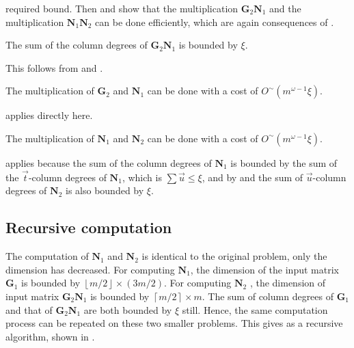 required bound. Then  and 
show that the multiplication $\mathbf{G}_{2}\mathbf{N}_{1}$ and the
multiplication $\mathbf{N}_{1}\mathbf{N}_{2}$ can be done efficiently,
which are again consequences of .
\begin{lem}
\label{lem:sizeOfG2N1}The sum of the column degrees of $\mathbf{G}_{2}\mathbf{N}_{1}$
is bounded by $\xi$.\end{lem}
\begin{pf}
This follows from 
and .\end{pf}
\begin{lem}
\label{lem:mutiplyingG2N1}The multiplication of $\mathbf{G}_{2}$
and $\mathbf{N}_{1}$ can be done with a cost of $O^{\sim}(m^{\omega-1}\xi)$.\end{lem}
\begin{pf}
 applies directly here.\end{pf}
\begin{lem}
\label{lem:multiplyingN1N2}The multiplication of $\mathbf{N}_{1}$
and $\mathbf{N}_{2}$ can be done with a cost of $O^{\sim}(m^{\omega-1}\xi)$.\end{lem}
\begin{pf}
 applies because the sum
of the column degrees of $\mathbf{N}_{1}$ is bounded by the sum of
the $\vec{t}$-column degrees of $\mathbf{N}_{1}$, which is $\sum\vec{u}\le\xi$,
and by  and 
the sum of $\vec{u}$-column degrees of $\mathbf{N}_{2}$ is also
bounded by $\xi$.
\end{pf}

\subsection{Recursive computation}

The computation of $\mathbf{N}_{1}$ and $\mathbf{N}_{2}$ is identical
to the original problem, only the dimension has decreased. For computing
$\mathbf{N}_{1}$, the dimension of the input matrix $\mathbf{G}_{1}$
is bounded by $\left\lfloor m/2\right\rfloor \times\left(3m/2\right)$.
For computing $\mathbf{N}_{2}$ , the dimension of input matrix $\mathbf{G}_{2}\mathbf{N}_{1}$
is bounded by $\left\lceil m/2\right\rceil \times m$. The sum of
column degrees of $\mathbf{G}_{1}$ and that of $\mathbf{G}_{2}\mathbf{N}_{1}$
are both bounded by $\xi$ still. Hence, the same computation process
can be repeated on these two smaller problems. This gives as a recursive
algorithm, shown in . 

